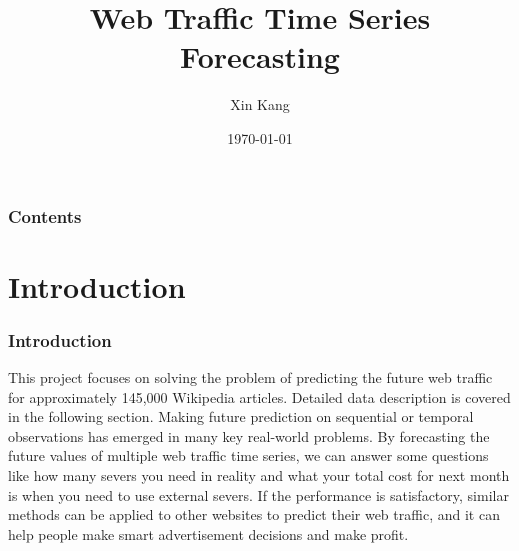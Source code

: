 \documentclass[cjk,10pt]{beamer}
\begin{document}
\begin{CJK*}{GBK}{song}     %
\title{Web Traffic Time Series Forecasting}
\author{Xin Kang}
\date{\today}
    \begin{frame} %
        \titlepage
    \end{frame}
    \begin{frame}
        \frametitle{Contents}
        \tableofcontents
    \end{frame}
    \section{Introduction}
    \begin{frame}
    \frametitle{Introduction}
    This project focuses on solving the problem of predicting the future web traffic for approximately 145,000 Wikipedia articles. Detailed data description is covered in the following section. Making future prediction on sequential or temporal observations has emerged in many key real-world problems. By forecasting the future values of multiple web traffic time series, we can answer some questions like how many severs you need in reality and what your total cost for next month is when you need to use external severs. If the performance is satisfactory, similar methods can be applied to other websites to predict their web traffic, and it can help people make smart advertisement decisions and make profit.
    \end{frame}

\end{CJK*}
\end{document}
